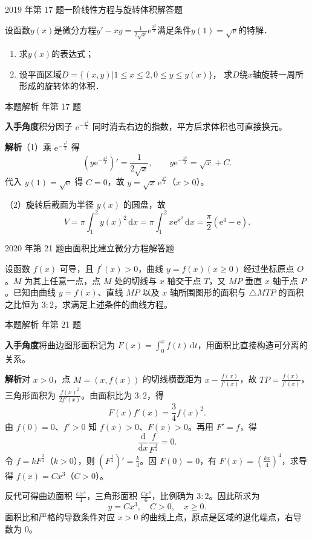 \documentclass[UTF8,zihao=-4,fontset=fandol]{ctexart}
\newcommand{\QuestionPage}[6]{%
  \par\noindent\begin{minipage}{\linewidth}
  \raggedright
  {\small\textcolor{black!60}{#3\quad #5}\hfill\textcolor{accent}{#2}}\par\smallskip}
\newcommand{\QuestionEnd}{\end{minipage}\par\medskip}
\newcommand{\QuestionPage}[6]{%
  \clearpage
  {\small\textcolor{accent}{#1\hfill #2}}\par\medskip
  {\small\textcolor{black!60}{#3\quad #5\hfill #6}}\par\vspace{9bp}}
\newcommand{\QuestionEnd}{}
\newenvironment{QuestionSolution}[1]{%
  \clearpage
  {\small\textcolor{black!60}{本题解析\quad #1}}\par\medskip
}{\par\clearpage}
\begin{document}
\QuestionPage{4.1 几类简单的微分方程}{解答题}{2019 年第 17 题}{2}{一阶线性方程与旋转体积}{213 / 234}
设函数$y(x)$是微分方程$y'-xy=\frac{1}{2\sqrt{x}}\mathrm{e}^{\frac{x^2}{2}}$满足条件$y(1)=\sqrt{\mathrm{e}}$的特解．
\begin{enumerate}
\item 求$y(x)$的表达式；
\item 设平面区域$D = \{(x,y)|1 \le x \le 2,0 \le y \le y(x)\}$，
      求$D$绕$x$轴旋转一周所形成的旋转体的体积．
\end{enumerate}
\QuestionEnd

\begin{QuestionSolution}{2019 年第 17 题}
\textbf{入手角度}\quad 积分因子 \(\mathrm{e}^{-\frac{x^2}{2}}\) 同时消去右边的指数，平方后求体积也可直接换元。

\textbf{解析}\quad （1）乘 \(\mathrm{e}^{-\frac{x^2}{2}}\) 得
\[
(y\mathrm{e}^{-\frac{x^2}{2}})'=\frac{1}{2\sqrt{x}},
\qquad y\mathrm{e}^{-\frac{x^2}{2}}=\sqrt{x}+C .
\]
代入 \(y(1)=\sqrt{\mathrm{e}}\) 得 \(C=0\)，故 \(\boxed{y=\sqrt{x}\,\mathrm{e}^{\frac{x^2}{2}}}\)（\(x>0\)）。

（2）旋转后截面为半径 \(y(x)\) 的圆盘，故
\[
V=\pi\int_1^2 y(x)^2\,\mathrm{d}x
=\pi\int_1^2 x\mathrm{e}^{x^2}\,\mathrm{d}x
=\boxed{\frac\pi2(\mathrm{e}^4-\mathrm{e})} .
\]
\end{QuestionSolution}

\QuestionPage{4.1 几类简单的微分方程}{解答题}{2020 年第 21 题}{4}{由面积比建立微分方程}{214 / 234}
设函数 \(f\left( x \right)\) 可导，且 \(f^{\prime}\left( x \right)>0\)，曲线 \(y=f\left( x \right)\left( x\geq 0 \right)\) 经过坐标原点 \(O\)。\(M\) 为其上任意一点，点 \(M\) 处的切线与 \(x\) 轴交于点 \(T\)，又 \(MP\) 垂直 \(x\) 轴于点 \(P\)。已知由曲线 \(y=f\left( x \right)\)、直线 \(MP\) 以及 \(x\) 轴所围图形的面积与 \(\triangle MTP\) 的面积之比恒为 \(3:2\)，求满足上述条件的曲线方程。
\QuestionEnd

\begin{QuestionSolution}{2020 年第 21 题}
\textbf{入手角度}\quad 将曲边图形面积记为 \(F(x)=\int_0^x f(t)\,\mathrm{d}t\)，用面积比直接构造可分离的关系。

\textbf{解析}\quad 对 \(x>0\)，点 \(M=(x,f(x))\) 的切线横截距为 \(x-\frac{f(x)}{f'(x)}\)，故 \(TP=\frac{f(x)}{f'(x)}\)，三角形面积为 \(\frac{f(x)^2}{2f'(x)}\)。由面积比为 \(3:2\)，得
\[
F(x)f'(x)=\frac34 f(x)^2.
\]
由 \(f(0)=0\)、\(f'>0\) 知 \(f(x)>0\)、\(F(x)>0\)。再用 \(F'=f\)，得
\[
\frac{\mathrm{d}}{\mathrm{d}x}\frac{f}{F^{\frac{3}{4}}}=0 .
\]
令 \(f=kF^{\frac{3}{4}}\)（\(k>0\)），则 \((F^{\frac{1}{4}})'=\frac{k}{4}\)。因 \(F(0)=0\)，有 \(F(x)=(\frac{kx}{4})^4\)，求导得 \(f(x)=Cx^3\)（\(C>0\)）。

反代可得曲边面积 \(\frac{Cx^4}{4}\)，三角形面积 \(\frac{Cx^4}{6}\)，比例确为 \(3:2\)。因此所求为
\[
\boxed{y=Cx^3,\quad C>0,\quad x\ge0}.
\]
面积比和严格的导数条件对应 \(x>0\) 的曲线上点，原点是区域的退化端点，右导数为 \(0\)。
\end{QuestionSolution}
\end{document}
